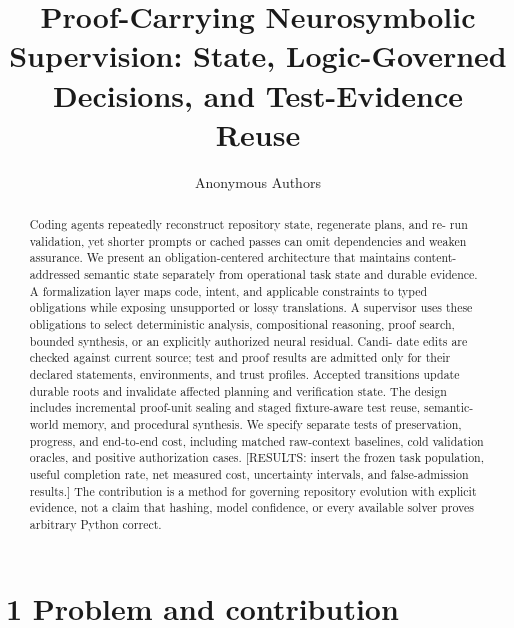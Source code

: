 \documentclass{article}
\title{Proof-Carrying Neurosymbolic Supervision: State, Logic-Governed Decisions, and Test-Evidence Reuse}
\author{Anonymous Authors}
\begin{document}
\maketitle
\begin{abstract}
Coding agents repeatedly reconstruct repository state, regenerate plans, and re-
run validation, yet shorter prompts or cached passes can omit dependencies and
weaken assurance. We present an obligation-centered architecture that maintains
content-addressed semantic state separately from operational task state and durable
evidence. A formalization layer maps code, intent, and applicable constraints to
typed obligations while exposing unsupported or lossy translations. A supervisor
uses these obligations to select deterministic analysis, compositional reasoning,
proof search, bounded synthesis, or an explicitly authorized neural residual. Candi-
date edits are checked against current source; test and proof results are admitted
only for their declared statements, environments, and trust profiles. Accepted
transitions update durable roots and invalidate affected planning and verification
state. The design includes incremental proof-unit sealing and staged fixture-aware
test reuse, semantic-world memory, and procedural synthesis. We specify separate
tests of preservation, progress, and end-to-end cost, including matched raw-context
baselines, cold validation oracles, and positive authorization cases. [RESULTS:
insert the frozen task population, useful completion rate, net measured cost,
uncertainty intervals, and false-admission results.] The contribution is a method
for governing repository evolution with explicit evidence, not a claim that hashing,
model confidence, or every available solver proves arbitrary Python correct.

\end{abstract}


\section*{1 Problem and contribution}
\end{document}
